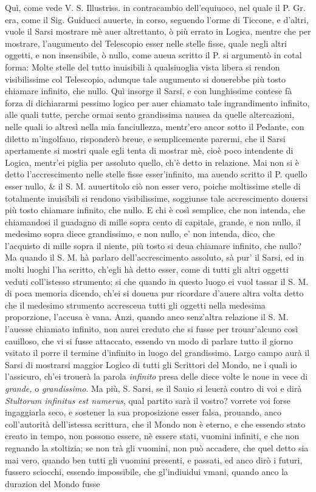 \documentclass[11pt,twoside,openany]{book}
\begin{document}
Quì, come vede V. S. Illustriss. in contracambio dell'equiuoco, nel quale il P. Gr. era, come il Sig. Guiducci auuerte, in corso, seguendo l'orme di Ticcone, e d'altri, vuole il Sarsi mostrare mè auer altrettanto, ò più errato in Logica, mentre che per mostrare, l'augumento del Telescopio esser nelle stelle fisse, quale negli altri oggetti, e non insensibile, ò nullo, come aueua scritto il P. si argumentò in cotal forma: Molte stelle del tutto inuisibili à qualsiuoglia vista libera si rendon visibilissime col Telescopio, adunque tale augumento si douerebbe più tosto chiamare infinito, che nullo. Quì insorge il Sarsi, e con lunghissime contese fà forza di dichiararmi pessimo logico per auer chiamato tale ingrandimento infinito, alle quali tutte, perche ormai sento grandissima nausea da quelle altercazioni, nelle quali io altresì nella mia fanciullezza, mentr'ero ancor sotto il Pedante, con diletto m'ingolfauo, risponderò breue, e semplicemente parermi, che il Sarsi apertamente si mostri quale egli tenta di mostrar mè, cioè poco intendente di Logica, mentr'ei piglia per assoluto quello, ch'è detto in relazione. Mai non si è detto l'accrescimento nelle stelle fisse esser'infinito, ma auendo scritto il P. quello esser nullo, \& il S. M. auuertitolo ciò non esser vero, poiche moltissime stelle di totalmente inuisibili si rendono visibilissime, soggiunse tale accrescimento douersi più tosto chiamare infinito, che nullo. E chi è così semplice, che non intenda, che chiamandosi il guadagno di mille sopra cento di capitale, grande, e non nullo, il medesimo sopra diece grandissimo, e non nullo, e' non intenda, dico, che l'acquisto di mille sopra il niente, più tosto si deua chiamare infinito, che nullo? Ma quando il S. M. hà parlaro dell'accrescimento assoluto, sà pur' il Sarsi, ed in molti luoghi l'ha scritto, ch'egli hà detto esser, come di tutti gli altri oggetti veduti coll'istesso strumento; si che quando in questo luogo ei vuol tassar il S. M. di poca memoria dicendo, ch'ei si doueua pur ricordare d'auere altra volta detto che il medesimo strumento accresceua tutti gli oggetti nella medesima proporzione, l'accusa è vana. Anzi, quando anco senz'altra relazione il S. M. l'auesse chiamato infinito, non aurei creduto che si fusse per trouar'alcuno così cauilloso, che vi si fusse attaccato, essendo vn modo di parlare tutto il giorno vsitato il porre il termine d'infinito in luogo del grandissimo. Largo campo aurà il Sarsi di mostrarsi maggior Logico di tutti gli Scrittori del Mondo, ne i quali io l'assicuro, ch'ei trouerà la parola \textit{infinito} presa delle diece volte le noue in vece di \textit{grande,} o \textit{grandissimo}. Ma più, S. Sarsi, se il Sauio si leuerà contro di voi e dirà \textit{Stultorum infinitus est numerus}, qual partito sarà il vostro? vorrete voi forse ingaggiarla seco, e sostener la sua proposizione esser falsa, prouando, anco coll'autorità dell'istessa scrittura, che il Mondo non è eterno, e che essendo stato creato in tempo, non possono essere, nè essere stati, vuomini infiniti, e che non regnando la stoltizia; se non trà gli vuomini, non può accadere, che quel detto sia mai vero, quando ben tutti gli vuomini presenti, e passati, ed anco dirò i futuri, fussero sciocchi, essendo impossibile, che gl'indiuidui vmani, quando anco la durazion del Mondo fusse 
\end{document}
